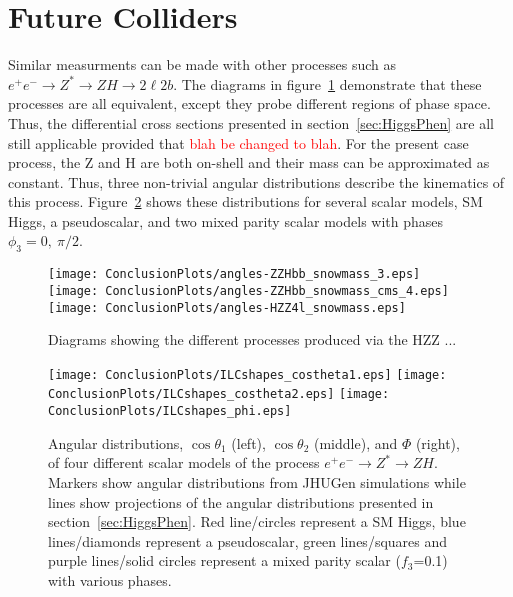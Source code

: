 \section{Future Colliders}

Similar measurments can be made with other processes such as
$e^+e^-\to Z^*\to ZH \to 2\ell2b$.  The diagrams in 
figure~\ref{fig:HZZprocesses} demonstrate that 
these processes are all equivalent, except they probe different 
regions of phase space.  Thus, the differential cross sections
presented in section~\ref{sec:HiggsPhen} are all still applicable
provided that \textcolor{red}{blah be changed to blah}. 
For the present case process, the Z and H are both on-shell 
and their mass can be approximated as constant. 
Thus, three non-trivial angular distributions describe 
the kinematics of this process. Figure~\ref{fig:ILCprojections}
shows these distributions for several scalar models, SM Higgs, a 
pseudoscalar, and two mixed parity scalar models with 
phases $\phi_3=0,~\pi/2$.  

\begin{figure}
\begin{center}
\texttt{[image: ConclusionPlots/angles-ZZHbb\_snowmass\_3.eps]}
\texttt{[image: ConclusionPlots/angles-ZZHbb\_snowmass\_cms\_4.eps]}
\texttt{[image: ConclusionPlots/angles-HZZ4l\_snowmass.eps]}
\caption{Diagrams showing the different processes produced
via the HZZ ... }
\label{fig:HZZprocesses}
\end{center}
\end{figure}

\begin{figure}
\begin{center}
\texttt{[image: ConclusionPlots/ILCshapes\_costheta1.eps]}
\texttt{[image: ConclusionPlots/ILCshapes\_costheta2.eps]}
\texttt{[image: ConclusionPlots/ILCshapes\_phi.eps]}
\caption{Angular distributions, $\cos\theta_1$ (left), 
$\cos\theta_2$ (middle), and $\Phi$ (right), of four different 
scalar models of the process $e^+e^-\to Z^*\to ZH$.  Markers
show angular distributions from JHUGen simulations while
lines show projections of the angular distributions presented
in section~\ref{sec:HiggsPhen}. Red line/circles represent a 
SM Higgs, blue lines/diamonds represent a pseudoscalar, green
lines/squares and purple lines/solid circles represent a 
mixed parity scalar ($f_3$=0.1) with various phases.}
\label{fig:ILCprojections}
\end{center}
\end{figure}

